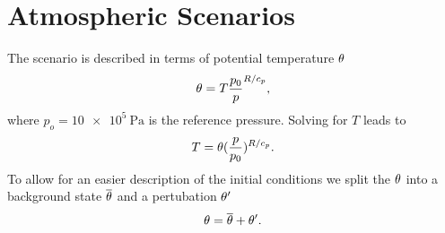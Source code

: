 \section{Atmospheric Scenarios}
The scenario is described in terms of potential temperature $\theta$
\begin{equation}
  \theta = T \frac{p_0}{p}^{R/c_p},
\end{equation}
where $p_o = \SI{10e5}{\Pa}$ is the reference pressure.
Solving for $T$ leads to
\begin{equation}
  \label{eq:potTToT}
  T = \theta (\frac{p}{p_0})^{R/c_p}.
\end{equation}
To allow for an easier description of the initial conditions we split the $\theta$ into a background state $\overline{\theta}$ and a pertubation $\theta'$
\begin{equation}
  \label{eq:potT-split}
  \theta = \overline{\theta} + \theta'.
\end{equation}

